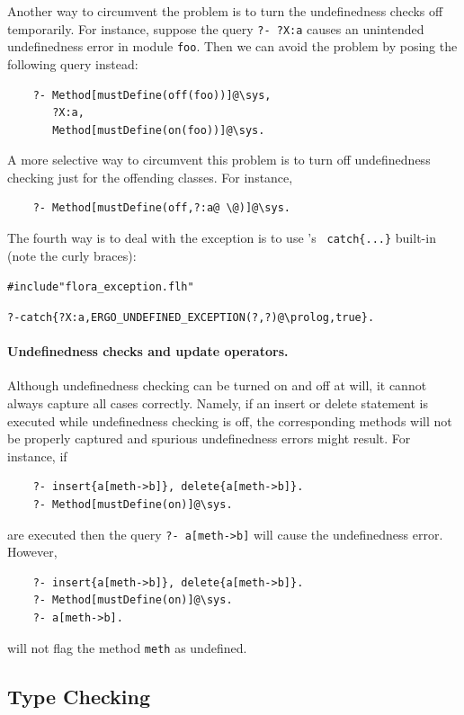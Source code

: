 \documentclass[11pt]{article}
\newcommand{\ERGO}{\mbox{\smaller{\ensuremath{\cal{E}}\smaller{{\sc{RGO}}}}}\xspace}
\newcommand{\FLSYSTEM}{\ERGO}
\newcommand{\FLUNDEFEXCEPTION}{ERGO\_UNDEFINED\_EXCEPTION}
\newcommand{\bs}{\textbackslash}
\begin{document}
Another way to circumvent  the problem is to turn the undefinedness checks
off temporarily. For instance, suppose the query {\tt ?- ?X:a} causes
an unintended undefinedness error in module {\tt foo}. Then we can avoid the
problem by posing the following query instead:
\begin{verbatim}
    ?- Method[mustDefine(off(foo))]@\sys,
       ?X:a,
       Method[mustDefine(on(foo))]@\sys.
\end{verbatim}
A more selective way to circumvent this problem is to turn off
undefinedness checking just for the offending classes. For instance,
\begin{verbatim}
    ?- Method[mustDefine(off,?:a@ \@)]@\sys.
\end{verbatim}

The fourth way is to deal with the exception is to use \FLSYSTEM's {\tt
  catch\{...\}} built-in (note the curly braces):
\begin{alltt}
    #include "flora_exception.flh"

    ?- catch\{?X:a, \FLUNDEFEXCEPTION(?,?)@\bs{}prolog, true\}.
\end{alltt}

\paragraph{Undefinedness checks and update operators.}
Although undefinedness checking can be turned on and off at will, it cannot
always capture all cases correctly. Namely, if an insert or delete
statement is executed while undefinedness checking is off, the
corresponding methods will not be properly captured and spurious
undefinedness errors might result.
For instance, if
\begin{verbatim}
    ?- insert{a[meth->b]}, delete{a[meth->b]}.
    ?- Method[mustDefine(on)]@\sys.
\end{verbatim}
are executed then the query {\tt ?- a[meth->b]} will cause the
undefinedness error. However,
\begin{verbatim}
    ?- insert{a[meth->b]}, delete{a[meth->b]}.
    ?- Method[mustDefine(on)]@\sys.
    ?- a[meth->b].
\end{verbatim}
will not flag the method {\tt meth} as undefined.


\subsection{Type Checking}\label{sec-typechecking}
\end{document}
